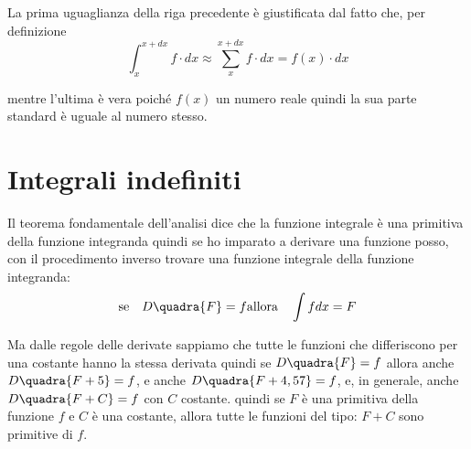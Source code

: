 La prima uguaglianza della riga
precedente è giustificata dal fatto che, per definizione 
\[\int_x^{x+dx} f \cdot dx \approx \sum_x^{x+dx} f \cdot dx = f(x) \cdot dx\]

mentre l'ultima è vera poiché \(f(x)\) un numero reale quindi la sua parte 
standard è uguale al numero stesso. 

% 
% 

\section{Integrali indefiniti}
\label{sec:integrali_indefiniti}

Il teorema fondamentale dell'analisi dice che la funzione integrale è una 
primitiva della funzione integranda quindi se ho imparato a derivare una 
funzione posso, con il procedimento inverso trovare una funzione integrale 
della funzione integranda:
\[\text{se} \quad D \quadra{F} = f \text{allora} \quad \int f dx = F\]

Ma dalle regole delle derivate sappiamo che tutte le funzioni che 
differiscono per una costante hanno la stessa derivata quindi se 
\(D \quadra{F} = f\) allora anche \(D \quadra{F+5} = f\), e anche 
\(D \quadra{F+4,57} = f\), e, in generale, anche \(D \quadra{F+C} = f\) con 
\(C\) costante.
quindi se \(F\) è una primitiva della funzione \(f\) e \(C\) è una 
costante, allora tutte le funzioni del tipo: \(F + C\) sono primitive di 
\(f\).


